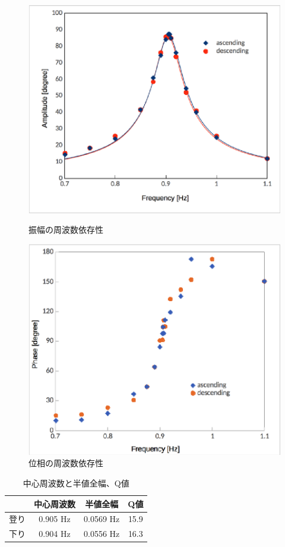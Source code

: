 \documentclass[11pt,a4]{jarticle}
\begin{document}
\begin{figure}[htbp]
 \begin{minipage}{0.5\hsize}
   \begin{center}
    \includegraphics[width=0.8\hsize]{./Lorenz.eps}
    \caption{振幅の周波数依存性}
     \label{fig:Lorenz}
   \end{center}
 \end{minipage}
 \begin{minipage}{0.5\hsize}
   \begin{center}
    \includegraphics[width=0.8\hsize]{./phase.eps}
    \caption{位相の周波数依存性}
     \label{fig:phase}
   \end{center}
 \end{minipage}
\end{figure}

\begin{table}[htbp]
   \begin{center}
  \begin{tabular}{c|ccc}
    & 中心周波数  & 半値全幅 & Q値\\ \hline
    登り& 0.905 Hz & 0.0569 Hz & 15.9\\
    下り& 0.904 Hz & 0.0556 Hz & 16.3
  \end{tabular}
  \label{tab:Q_value_etc}
     \end{center}
       \caption{中心周波数と半値全幅、Q値}
\end{table}
\end{document}

